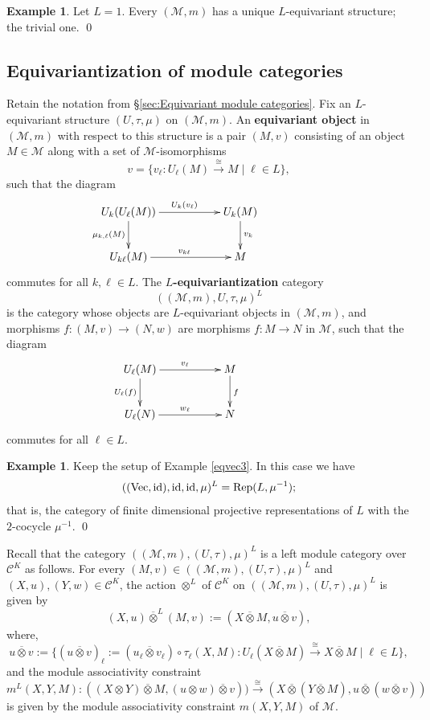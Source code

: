 \documentclass{amsart}
\theoremstyle{definition}
\newtheorem{example}[theorem]{Example}
\newcommand{\id}{{\rm id}}
\newcommand{\Vect}{{\rm Vec}}
\newcommand{\C}{\mathscr{C}}
\newcommand{\M}{\mathscr{M}}
\newcommand{\ot}{\otimes}
\numberwithin{equation}{section}
\begin{document}
\begin{example}\label{L=1}
Let $L=1$. Every $(\M,m)$ has a unique $L$-equivariant structure; the trivial one. \qed
\end{example}

\subsection{Equivariantization of module categories}\label{sec:Equivariantization of module categories}
Retain the notation from \S\ref{sec:Equivariant module categories}. Fix an $L$-equivariant structure $(U,\tau,\mu)$ on $(\M,m)$. An {\bf equivariant object} in $(\M,m)$ with respect to this structure is a pair $(M,v)$ consisting of an object $M\in \M$ along with a set of $\M$-isomorphisms 
$$v=\{v_{\ell}: U_{\ell}(M)\xrightarrow{\cong} M\mid {\ell}\in L\},$$ such that the diagram
\begin{equation}\label{diagramv}
\xymatrix{U_k(U_{\ell}(M))\ar[d]_{\mu_{k,\ell}(M)}\ar[rr]^{U_k(v_{\ell})}&& U_k(M)\ar[d]^{v_k} &&\\
U_{k\ell}(M)\ar[rr]^{v_{k\ell}}&& M&&}
\end{equation}
commutes for all $k,\ell\in L$. The {\bf $L$-equivariantization} category
$$((\M,m),U,\tau,\mu)^L$$ 
is the category whose objects are $L$-equivariant objects in $(\M,m)$, and morphisms $f:(M,v)\to (N,w)$ are morphisms $f:M\to N$ in $\M$, such that the diagram
\begin{equation}\label{diagramvmor}
\xymatrix{U_{\ell}(M)\ar[d]_{U_{\ell}(f)}\ar[rr]^{v_{\ell}}&& M\ar[d]^{f} &&\\
U_{\ell}(N)\ar[rr]^{w_{\ell}}&& N&&}
\end{equation}
commutes for all $\ell\in L$.

\begin{example}\label{eqvec4}
Keep the setup of Example \ref{eqvec3}. In this case we have 
$$((\Vect,\id),\id,\id,\mu)^L={\rm Rep}(L,\mu^{-1});$$ 
that is, the category of finite dimensional projective representations of $L$ with the $2$-cocycle $\mu^{-1}$. \qed
\end{example}

Recall \cite{ENO} that the category $((\M,m),(U,\tau),\mu)^L$ is a left module category over $\C^K$ as follows.
For every $(M,v)\in ((\M,m),(U,\tau),\mu)^L$ and $(X,u),(Y,w)\in \C^K$, the action $\ot^L$ of $\C^K$ on $((\M,m),(U,\tau),\mu)^L$ is given by $$(X,u)\overline{\ot}^{L}(M,v):=(X\overline{\ot} M,u\overline{\ot} v),$$ where,   
$$u\overline{\ot}v:=\{(u\overline{\ot}v)_{\ell}:=(u_{\ell}\overline{\ot} v_{\ell})\circ\tau_{\ell}(X,M):U_{\ell}(X\overline{\ot}M)\xrightarrow{\cong} X\overline{\ot}M\mid \ell\in L\},$$ and the module associativity constraint
$$m^L(X,Y,M):((X\ot Y)\overline{\ot} M,(u\ot w)\overline{\ot}v))\xrightarrow{\cong}(X\overline{\ot}(Y\overline{\ot}M),u\overline{\ot}(w\overline{\ot}v))
$$
is given by the module associativity constraint $m(X,Y,M)$ of $\M$.
\end{document}
